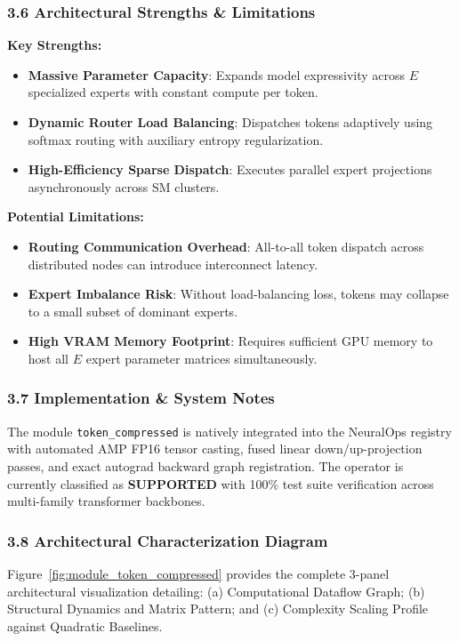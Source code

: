 \subsubsection*{3.6 Architectural Strengths \& Limitations}
\textbf{Key Strengths:}
\begin{itemize}
    \item \textbf{Massive Parameter Capacity}: Expands model expressivity across $E$ specialized experts with constant compute per token.
    \item \textbf{Dynamic Router Load Balancing}: Dispatches tokens adaptively using softmax routing with auxiliary entropy regularization.
    \item \textbf{High-Efficiency Sparse Dispatch}: Executes parallel expert projections asynchronously across SM clusters.
\end{itemize}

\textbf{Potential Limitations:}
\begin{itemize}
    \item \textbf{Routing Communication Overhead}: All-to-all token dispatch across distributed nodes can introduce interconnect latency.
    \item \textbf{Expert Imbalance Risk}: Without load-balancing loss, tokens may collapse to a small subset of dominant experts.
    \item \textbf{High VRAM Memory Footprint}: Requires sufficient GPU memory to host all $E$ expert parameter matrices simultaneously.
\end{itemize}

\subsubsection*{3.7 Implementation \& System Notes}
The module \texttt{token\_compressed} is natively integrated into the NeuralOps registry with automated AMP FP16 tensor casting, fused linear down/up-projection passes, and exact autograd backward graph registration. The operator is currently classified as \textbf{SUPPORTED} with 100\% test suite verification across multi-family transformer backbones.

\subsubsection*{3.8 Architectural Characterization Diagram}
Figure~\ref{fig:module_token_compressed} provides the complete 3-panel architectural visualization detailing: (a) Computational Dataflow Graph; (b) Structural Dynamics and Matrix Pattern; and (c) Complexity Scaling Profile against Quadratic Baselines.


